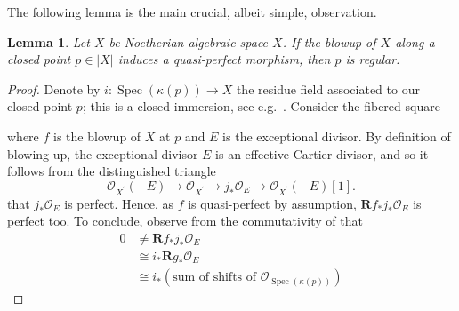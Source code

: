 \documentclass[11pt]{amsart}
\let\oldequation\equation
\let\oldendequation\endequation
\renewenvironment{equation}{\linenomathNonumbers\oldequation}{\oldendequation\endlinenomath}
\theoremstyle{plain}
\newtheorem{lemma}[theorem]{Lemma}
\theoremstyle{definition}
\numberwithin{equation}{section}
\numberwithin{theorem}{section}
\begin{document}
\begin{appendix}
The following lemma is the main crucial, albeit simple, observation. 

\begin{lemma}
    \label{lem:regularity_via_blowups}
    Let $X$ be Noetherian algebraic space $X$.
    If the blowup of $X$ along a closed point $p\in |X|$ induces a quasi-perfect morphism, then $p$ is regular.
\end{lemma}

\begin{proof}
    Denote by $i\colon \operatorname{Spec}(\kappa(p))\to X$ the residue field associated to our closed point $p$; this is a closed immersion, see e.g.\ \cite[\href{https://stacks.math.columbia.edu/tag/0H1R}{Tag 0H1R} \& \href{https://stacks.math.columbia.edu/tag/0H1U}{Tag 0H1U}]{StacksProject}.
    Consider the fibered square
    \begin{equation}
        \label{dia:blowup_square}
    \end{equation}
    where $f$ is the blowup of $X$ at $p$ and $E$ is the exceptional divisor. 
    By definition of blowing up, the exceptional divisor $E$ is an effective Cartier divisor, and so it follows from the distinguished triangle
    \begin{displaymath}
        \mathcal{O}_{X^\prime} (-E) \to \mathcal{O}_{X^\prime} \to j_\ast \mathcal{O}_E \to \mathcal{O}_{X^\prime} (-E)[1].
    \end{displaymath}
    that $j_\ast \mathcal{O}_E$ is perfect. 
    Hence, as $f$ is quasi-perfect by assumption, $\mathbf{R}f_\ast j_\ast \mathcal{O}_E $ is perfect too. 
    To conclude, observe from the commutativity of  that
    \begin{displaymath}
        \begin{aligned}
            0 &\not= \mathbf{R} f_\ast j_\ast \mathcal{O}_E 
            \\&\cong i_\ast \mathbf{R}g_\ast \mathcal{O}_E 
            \\&\cong i_\ast (\text{sum of shifts of } \mathcal{O}_{\operatorname{Spec}(\kappa(p))})

\end{aligned}
\end{displaymath}
\end{proof}
\end{appendix}
\end{document}
